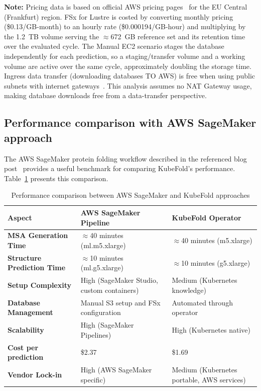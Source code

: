 \textbf{Note:} Pricing data is based on official AWS pricing pages~\cite{aws-ec2-pricing,aws-fsx-pricing} for the EU Central (Frankfurt) region. FSx for Lustre is costed by converting monthly pricing (\$0.13/GB-month) to an hourly rate (\$0.000194/GB-hour) and multiplying by the 1.2~TB volume serving the $\approx$672~GB reference set and its retention time over the evaluated cycle. The Manual EC2 scenario stages the database independently for each prediction, so a staging/transfer volume and a working volume are active over the same cycle, approximately doubling the storage time. Ingress data transfer (downloading databases TO AWS) is free when using public subnets with internet gateways~\cite{aws-ec2-pricing}. This analysis assumes no NAT Gateway usage, making database downloads free from a data-transfer perspective.

\subsection{Performance comparison with AWS SageMaker approach}

The AWS SageMaker protein folding workflow described in the referenced blog post~\cite{aws-sagemaker-protein-folding} provides a useful benchmark for comparing KubeFold's performance. Table~\ref{tab:sagemaker_comparison} presents this comparison.

\begin{table}[H]
    \centering
    \caption{Performance comparison between AWS SageMaker and KubeFold approaches}
    \label{tab:sagemaker_comparison}
    \small
    \begin{tabularx}{\textwidth}{|>{\centering\arraybackslash}X|>{\centering\arraybackslash}X|>{\centering\arraybackslash}X|}
        \hline
        \textbf{Aspect} & \textbf{AWS SageMaker Pipeline} & \textbf{KubeFold Operator} \\
        \hline
        \textbf{MSA Generation Time} & $\approx$40 minutes (ml.m5.xlarge) & $\approx$40 minutes (m5.xlarge) \\
        \hline
        \textbf{Structure Prediction Time} & $\approx$10 minutes (ml.g5.xlarge) & $\approx$10 minutes (g5.xlarge) \\
        \hline
        \textbf{Setup Complexity} & High (SageMaker Studio, custom containers) & Medium (Kubernetes knowledge) \\
        \hline
        \textbf{Database Management} & Manual S3 setup and FSx configuration & Automated through operator \\
        \hline
        \textbf{Scalability} & High (SageMaker Pipelines) & High (Kubernetes native) \\
        \hline
        \textbf{Cost per prediction} & \$2.37 & \$1.69 \\
        \hline
        \textbf{Vendor Lock-in} & High (AWS SageMaker specific) & Medium (Kubernetes portable, AWS services) \\
        \hline
    \end{tabularx}
\end{table}

